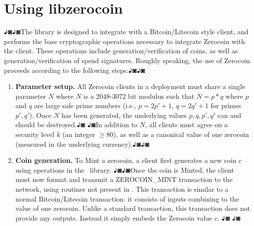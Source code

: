 \section{Using libzerocoin}♪◙♪◙The \libzerocoin library is designed to integrate with a Bitcoin/Litecoin style client, and performs the base cryptographic operations necessary to integrate Zerocoin with the client. These operations include generation/verification of coins, as well as generation/verification of spend signatures. Roughly speaking, the use of Zerocoin proceeds according to the following steps:♪◙♪◙\begin{enumerate}♪◙\item {\bf Parameter setup.} All Zerocoin clients in a deployment must share a single parameter $N$ where $N$ is a 2048-3072 bit modulus such that $N = p*q$ where $p$ and $q$ are large safe prime numbers (i.e., $p = 2p'+1$, $q = 2q'+1$ for primes $p', q'$). Once $N$ has been generated, the underlying values $p, q, p', q'$ can and should be destroyed.♪◙ ♪◙In addition to $N$, all clients must agree on a security level $k$ (an integer $\ge 80$), as well as a canonical value of one zerocoin (measured in the underlying currency).♪◙♪◙\item {\bf Coin generation.} To Mint a zerocoin, a client first generates a new coin $c$ using operations in the \libzerocoin~library. ♪◙♪◙Once the coin is Minted, the client must now format and transmit a \textsf{ZEROCOIN\_MINT} transaction to the network, using routines not present in \libzerocoin. This transaction is similar to a normal Bitcoin/Litecoin transaction: it consists of inputs combining to the value of one zerocoin. Unlike a standard transaction, this transaction does not provide any outputs. Instead it simply embeds the Zerocoin value $c$. ♪◙ ♪◙\end{enumerate} 